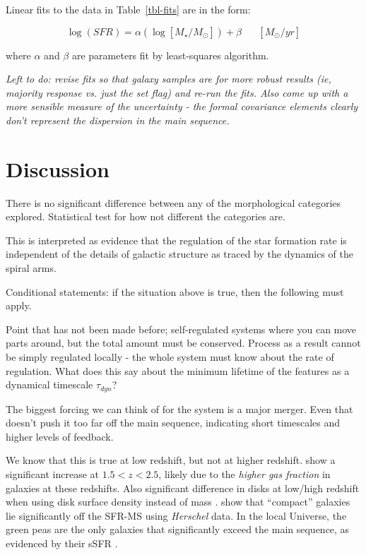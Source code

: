 \documentclass{emulateapj}
\begin{document}
Linear fits to the data in Table~\ref{tbl-fits} are in the form:

\begin{equation}
\log(SFR) = \alpha(\log[M_\star/M_\odot]) + \beta \hspace{20pt}[M_\odot/yr]
\label{eqn-linearfit}
\end{equation}

\noindent where $\alpha$ and $\beta$ are parameters fit by least-squares algorithm.

\emph{Left to do: revise fits so that galaxy samples are for more robust results (ie, majority response vs. just the set flag) and re-run the fits. Also come up with a more sensible measure of the uncertainty - the formal covariance elements clearly don't represent the dispersion in the main sequence.}


\section{Discussion}\label{sec-discussion}

There is no significant difference between any of the morphological categories explored. Statistical test for how not different the categories are. 

This is interpreted as evidence that the regulation of the star formation rate is independent of the details of galactic structure as traced by the dynamics of the spiral arms. 

Conditional statements: if the situation above is true, then the following must apply. 

Point that has not been made before; self-regulated systems where you can move parts around, but the total amount must be conserved. Process as a result cannot be simply regulated locally - the whole system must know about the rate of regulation. What does this say about the minimum lifetime of the features as a dynamical timescale $\tau_{dyn}$? 

The biggest forcing we can think of for the system is a major merger. Even that doesn't push it too far off the main sequence, indicating short timescales and higher levels of feedback.

We know that this is true at low redshift, but not at higher redshift. \citet{rod11} show a significant increase at $1.5<z<2.5$, likely due to the \emph{higher gas fraction} in galaxies at these redshifts. Also significant difference in disks at low/high redshift when using disk surface density instead of mass \citep{dad10}. \citet{elb11} show that ``compact'' galaxies lie significantly off the SFR-MS using {\it Herschel} data. In the local Universe, the green peas are the only galaxies that significantly exceed the main sequence, as evidenced by their sSFR \citep{car09}. 
\end{document}
